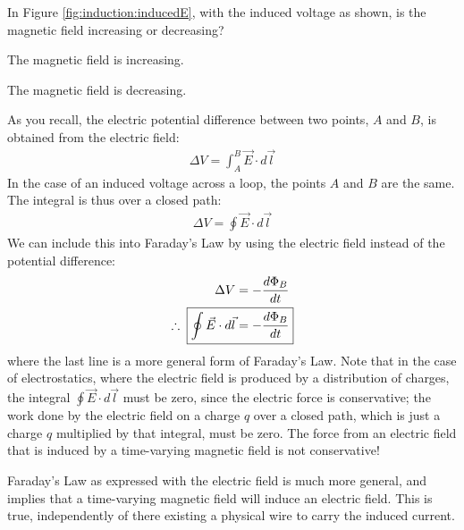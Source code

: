 \begin{checkpoint}{}
	\begin{MCquestion}{In Figure \ref{fig:induction:inducedE}, with the induced voltage as shown, is the magnetic field increasing or decreasing?}
		\item The magnetic field is increasing.
		\item The magnetic field is decreasing. \correct
	\end{MCquestion}
\end{checkpoint}
As you recall, the electric potential difference between two points, $A$ and $B$, is obtained from the electric field:
\begin{align*}
\Delta V = \int_A^B \vec E\cdot d\vec l
\end{align*}
In the case of an induced voltage across a loop, the points $A$ and $B$ are the same. The integral is thus over a closed path:
\begin{align*}
\Delta V = \oint \vec E\cdot d\vec l
\end{align*}
We can include this into Faraday's Law by using the electric field instead of the potential difference:
\begin{align*}
\Delta V &=-\frac{d\Phi_B}{dt}\\
\therefore \;\;\Aboxed{\oint \vec E\cdot d\vec l &= -\frac{d\Phi_B}{dt}}
\end{align*}
where the last line is a more general form of Faraday's Law. Note that in the case of electrostatics, where the electric field is produced by a distribution of charges, the integral $\oint \vec E\cdot d\vec l$ must be zero, since the electric force is conservative; the work done by the electric field on a charge $q$ over a closed path, which is just a charge $q$ multiplied by that integral, must be zero. The force from an electric field that is induced by a time-varying magnetic field is not conservative!

Faraday's Law as expressed with the electric field is much more general, and implies that a time-varying magnetic field will induce an electric field. This is true, independently of there existing a physical wire to carry the induced current. 

